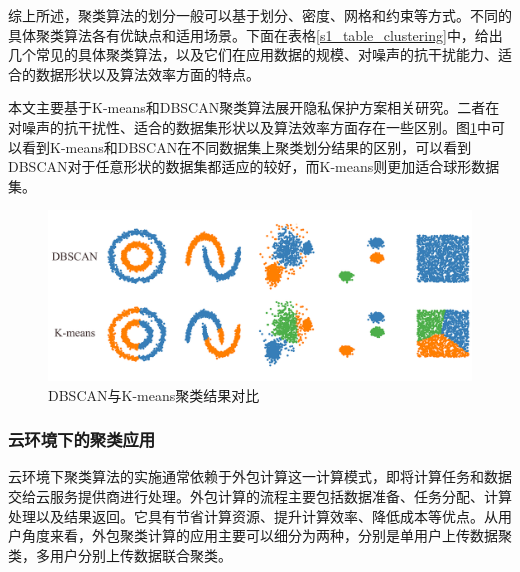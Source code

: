 综上所述，聚类算法的划分一般可以基于划分、密度、网格和约束等方式。不同的具体聚类算法各有优缺点和适用场景。下面在表格\ref{s1_table_clustering}中，给出几个常见的具体聚类算法，以及它们在应用数据的规模、对噪声的抗干扰能力、适合的数据形状以及算法效率方面的特点。
\begin{table}[htbp]
	\centering
	\renewcommand{\arraystretch}{1.3}
	\caption{常见聚类算法比较}
	\label{s1_table_clustering}
\end{table}

本文主要基于K-means和DBSCAN聚类算法展开隐私保护方案相关研究。二者在对噪声的抗干扰性、适合的数据集形状以及算法效率方面存在一些区别。图\ref{clu_difference}中可以看到K-means和DBSCAN在不同数据集上聚类划分结果的区别，可以看到DBSCAN对于任意形状的数据集都适应的较好，而K-means则更加适合球形数据集。

\begin{figure}[htbp]
	\centering
	\includegraphics[width=\linewidth]{img/difference.png}
	\caption{DBSCAN与K-means聚类结果对比}
	\label{clu_difference}
\end{figure}

\subsubsection{云环境下的聚类应用}
\label{juleiyanjiu}
云环境下聚类算法的实施通常依赖于外包计算这一计算模式，即将计算任务和数据交给云服务提供商进行处理。外包计算的流程主要包括数据准备、任务分配、计算处理以及结果返回。它具有节省计算资源、提升计算效率、降低成本等优点。从用户角度来看，外包聚类计算的应用主要可以细分为两种，分别是单用户上传数据聚类，多用户分别上传数据联合聚类。

